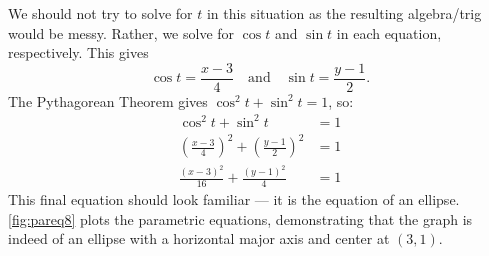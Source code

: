 {We should not try to solve for $t$ in this situation as the resulting algebra/trig would be messy. Rather, we solve for $\cos t$ and $\sin t$ in each equation, respectively. This gives
\[\cos t = \frac{x-3}{4} \quad \text{and}\quad \sin t=\frac{y-1}{2}.\]
The Pythagorean Theorem gives $\cos^2t+\sin^2t=1$, so:
\begin{align*}
\cos^2t+\sin^2t &=1 \\
\left(\frac{x-3}{4}\right)^2 +\left(\frac{y-1}{2}\right)^2 &=1\\
\frac{(x-3)^2}{16}+\frac{(y-1)^2}{4} &=1
\end{align*}
This final equation should look familiar --- it is the equation of an ellipse. \autoref{fig:pareq8} plots the parametric equations, demonstrating that the graph is indeed of an ellipse with a horizontal major axis and center at $(3,1)$.}



%

